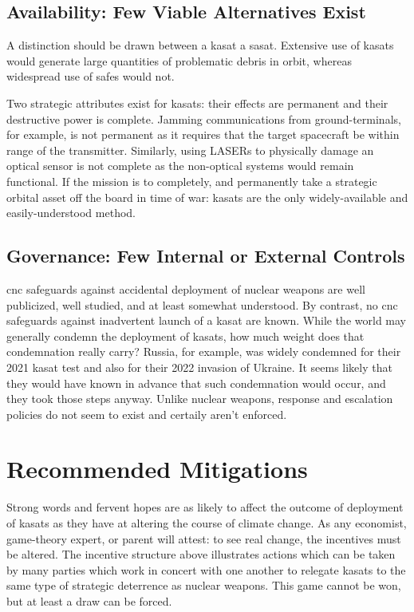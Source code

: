 \subsection*{Availability: Few Viable Alternatives Exist}

A distinction should be drawn between a \acf{kasat} a \acf{sasat}.
Extensive use of \acp{kasat} would generate large quantities of
problematic debris in orbit, whereas widespread use of \acp{safe}
would not.

Two strategic attributes exist for \acp{kasat}: their effects are
permanent and their destructive power is complete.  Jamming
communications from ground-terminals, for example, is not permanent as
it requires that the target spacecraft be within range of the
transmitter.  Similarly, using LASERs to physically damage an optical
sensor is not complete as the non-optical systems would remain
functional.  If the mission is to completely, and permanently take a
strategic orbital asset off the board in time of war: \acp{kasat} are
the only widely-available and easily-understood method.


\subsection*{Governance: Few Internal or External Controls}

\ac{cnc} safeguards against accidental deployment of nuclear weapons
are well publicized, well studied, and at least somewhat understood.
By contrast, no \ac{cnc} safeguards against inadvertent launch of a
\ac{kasat} are known.  While the world may generally condemn the
deployment of \acp{kasat}, how much weight does that condemnation
really carry?  Russia, for example, was widely condemned for their
2021 \ac{kasat} test and also for their 2022 invasion of Ukraine.  It
seems likely that they would have known in advance that such
condemnation would occur, and they took those steps anyway.  Unlike
nuclear weapons, response and escalation policies do not seem to
exist and certaily aren't enforced.


\section*{Recommended Mitigations}

Strong words and fervent hopes are as likely to affect the outcome of
deployment of \acp{kasat} as they have at altering the course of
climate change.  As any economist, game-theory expert, or parent will
attest: to see real change, the incentives must be altered.  The
incentive structure above illustrates actions which can be taken by
many parties which work in concert with one another to relegate
\acp{kasat} to the same type of strategic deterrence as nuclear
weapons.  This game cannot be won, but at least a draw can be forced.



